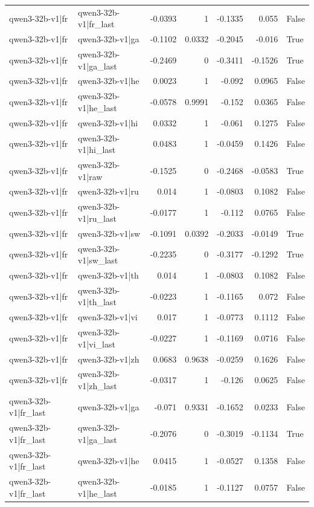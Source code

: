 \begin{table}
\begin{tabular}{l l r r r r l}
qwen3-32b-v1|fr & qwen3-32b-v1|fr_last & -0.0393 & 1 & -0.1335 & 0.055 & False \\
qwen3-32b-v1|fr & qwen3-32b-v1|ga & -0.1102 & 0.0332 & -0.2045 & -0.016 & True \\
qwen3-32b-v1|fr & qwen3-32b-v1|ga_last & -0.2469 & 0 & -0.3411 & -0.1526 & True \\
qwen3-32b-v1|fr & qwen3-32b-v1|he & 0.0023 & 1 & -0.092 & 0.0965 & False \\
qwen3-32b-v1|fr & qwen3-32b-v1|he_last & -0.0578 & 0.9991 & -0.152 & 0.0365 & False \\
qwen3-32b-v1|fr & qwen3-32b-v1|hi & 0.0332 & 1 & -0.061 & 0.1275 & False \\
qwen3-32b-v1|fr & qwen3-32b-v1|hi_last & 0.0483 & 1 & -0.0459 & 0.1426 & False \\
qwen3-32b-v1|fr & qwen3-32b-v1|raw & -0.1525 & 0 & -0.2468 & -0.0583 & True \\
qwen3-32b-v1|fr & qwen3-32b-v1|ru & 0.014 & 1 & -0.0803 & 0.1082 & False \\
qwen3-32b-v1|fr & qwen3-32b-v1|ru_last & -0.0177 & 1 & -0.112 & 0.0765 & False \\
qwen3-32b-v1|fr & qwen3-32b-v1|sw & -0.1091 & 0.0392 & -0.2033 & -0.0149 & True \\
qwen3-32b-v1|fr & qwen3-32b-v1|sw_last & -0.2235 & 0 & -0.3177 & -0.1292 & True \\
qwen3-32b-v1|fr & qwen3-32b-v1|th & 0.014 & 1 & -0.0803 & 0.1082 & False \\
qwen3-32b-v1|fr & qwen3-32b-v1|th_last & -0.0223 & 1 & -0.1165 & 0.072 & False \\
qwen3-32b-v1|fr & qwen3-32b-v1|vi & 0.017 & 1 & -0.0773 & 0.1112 & False \\
qwen3-32b-v1|fr & qwen3-32b-v1|vi_last & -0.0227 & 1 & -0.1169 & 0.0716 & False \\
qwen3-32b-v1|fr & qwen3-32b-v1|zh & 0.0683 & 0.9638 & -0.0259 & 0.1626 & False \\
qwen3-32b-v1|fr & qwen3-32b-v1|zh_last & -0.0317 & 1 & -0.126 & 0.0625 & False \\
qwen3-32b-v1|fr_last & qwen3-32b-v1|ga & -0.071 & 0.9331 & -0.1652 & 0.0233 & False \\
qwen3-32b-v1|fr_last & qwen3-32b-v1|ga_last & -0.2076 & 0 & -0.3019 & -0.1134 & True \\
qwen3-32b-v1|fr_last & qwen3-32b-v1|he & 0.0415 & 1 & -0.0527 & 0.1358 & False \\
qwen3-32b-v1|fr_last & qwen3-32b-v1|he_last & -0.0185 & 1 & -0.1127 & 0.0757 & False \\

\end{tabular}
\end{table}
